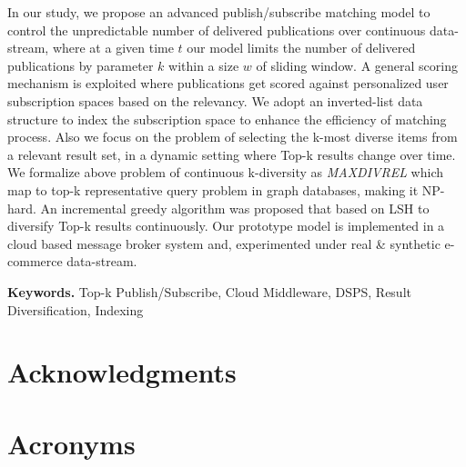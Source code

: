 \documentclass[a4paper,12pt,oneside]{book}
\theoremstyle{definition}
\theoremstyle{remark}
\begin{document}
In our study, we propose an advanced publish/subscribe matching model to control the unpredictable number of delivered publications over continuous data-stream, where at a given time $t$ our model limits the number of delivered publications by parameter $k$ within a size $w$ of sliding window. A general scoring mechanism is exploited where publications get scored against personalized user subscription spaces based on the relevancy. We adopt an inverted-list data structure to index the subscription space to enhance the efficiency of matching process. Also we focus on the problem of selecting the k-most diverse items from a relevant result set, in a dynamic setting where Top-k results change over time. We formalize above problem of continuous k-diversity as \emph{MAXDIVREL} which map to top-k representative query problem in graph databases, making it NP-hard. An incremental greedy algorithm was proposed that based on \ac{LSH} to diversify Top-k results continuously. Our prototype model is implemented in a cloud based message broker system and, experimented under real \& synthetic e-commerce data-stream.

\noindent \textbf{Keywords.} Top-k Publish/Subscribe, Cloud Middleware, \ac{DSPS}, Result Diversification, Indexing


\newpage
\section*{Acknowledgments}

\newpage
\tableofcontents

\listoffigures
{}

\listoftables
{}

\listofalgorithms
{}

\newpage
\section*{Acronyms}
\begin{acronym}
\end{acronym}
\end{document}
